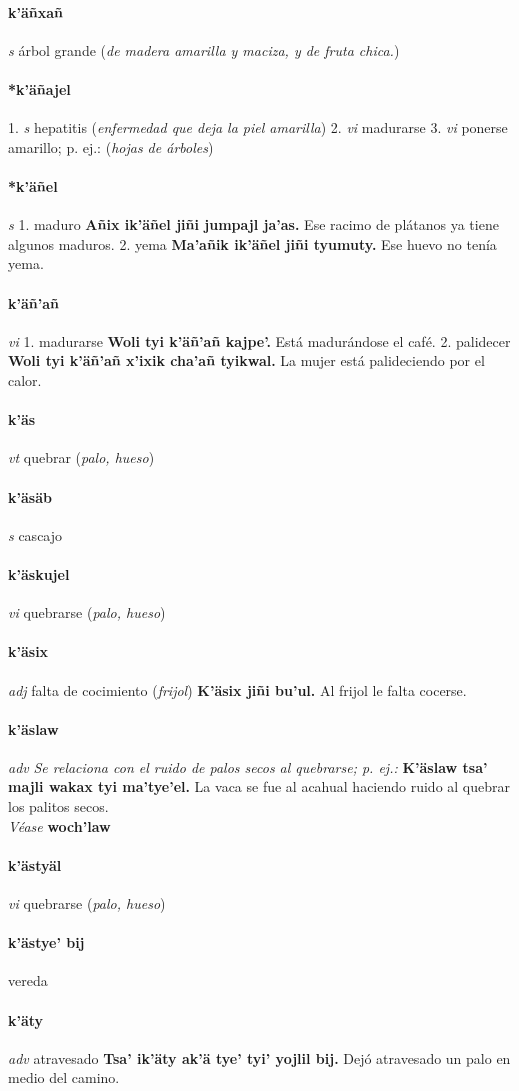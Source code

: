 \documentclass{scrbook}
\newcommand{\entry}[1]{\paragraph{#1}}
\newcommand{\onedefinition}[1]{#1.}
\newcommand{\nontranslationdef}[1]{\textit{#1}}
\newcommand{\partofspeech}[1]{\textit{#1}}
\newcommand{\spanishtranslation}[1]{#1}
\newcommand{\clarification}[1]{(\textit{#1})}
\newcommand{\cholexample}[1]{\textbf{#1}}
\newcommand{\exampletranslation}[1]{#1}
\newcommand{\alsosee}[1]{\\\textit{Véase} \textbf{#1}}
\begin{document}
\begin{multicols}{2}
\entry{k'äñxañ}
\partofspeech{s}
\spanishtranslation{árbol grande}
\clarification{de madera amarilla y maciza, y de fruta chica.}

\entry{*k'äñajel}
\onedefinition{1}
\partofspeech{s}
\spanishtranslation{hepatitis}
\clarification{enfermedad que deja la piel amarilla}
\onedefinition{2}
\partofspeech{vi}
\spanishtranslation{madurarse}
\onedefinition{3}
\partofspeech{vi}
\spanishtranslation{ponerse amarillo; p. ej.:}
\clarification{hojas de árboles}

\entry{*k'äñel}
\partofspeech{s}
\onedefinition{1}
\spanishtranslation{maduro}
\cholexample{Añix ik'äñel jiñi jumpajl ja'as.}
\exampletranslation{Ese racimo de plátanos ya tiene algunos maduros.}
\onedefinition{2}
\spanishtranslation{yema}
\cholexample{Ma'añik ik'äñel jiñi tyumuty.}
\exampletranslation{Ese huevo no tenía yema.}

\entry{k'äñ'añ}
\partofspeech{vi}
\onedefinition{1}
\spanishtranslation{madurarse}
\cholexample{Woli tyi k'äñ'añ kajpe'.}
\exampletranslation{Está madurándose el café.}
\onedefinition{2}
\spanishtranslation{palidecer}
\cholexample{Woli tyi k'äñ'añ x'ixik cha'añ tyikwal.}
\exampletranslation{La mujer está palideciendo por el calor.}

\entry{k'äs}
\partofspeech{vt}
\spanishtranslation{quebrar}
\clarification{palo, hueso}

\entry{k'äsäb}
\partofspeech{s}
\spanishtranslation{cascajo}

\entry{k'äskujel}
\partofspeech{vi}
\spanishtranslation{quebrarse}
\clarification{palo, hueso}

\entry{k'äsix}
\partofspeech{adj}
\spanishtranslation{falta de cocimiento}
\clarification{frijol}
\cholexample{K'äsix jiñi bu'ul.}
\exampletranslation{Al frijol le falta cocerse.}

\entry{k'äslaw}
\partofspeech{adv}
\nontranslationdef{Se relaciona con el ruido de palos secos al quebrarse; p. ej.:}
\cholexample{K'äslaw tsa' majli wakax tyi ma'tye'el.}
\exampletranslation{La vaca se fue al acahual haciendo ruido al quebrar los palitos secos.}
\alsosee{woch'law}

\entry{k'ästyäl}
\partofspeech{vi}
\spanishtranslation{quebrarse}
\clarification{palo, hueso}

\entry{k'ästye' bij}
\spanishtranslation{vereda}

\entry{k'äty}
\partofspeech{adv}
\spanishtranslation{atravesado}
\cholexample{Tsa' ik'äty ak'ä tye' tyi' yojlil bij.}
\exampletranslation{Dejó atravesado un palo en medio del camino.}


\end{multicols}
\end{document}
